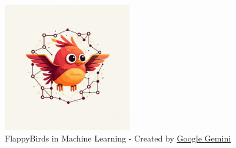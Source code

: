 \documentclass[a4paper,12pt]{article}
\begin{document}
\begin{figure}[H]
    \centering
    \includegraphics[width=0.5\textwidth]{ai_image.jpg}
    \caption{FlappyBirds in Machine Learning - Created by \href{https://gemini.google.com/}{Google Gemini}}
    \label{fig:gemini}
\end{figure}
\end{document}
